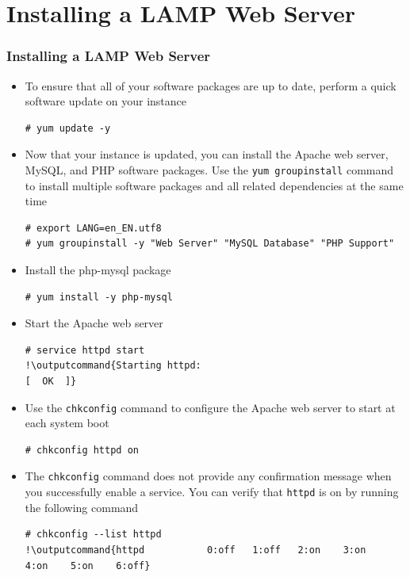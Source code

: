 \documentclass{beamer}
\newcommand{\outputcommand}[1]{\color{darkgreen}{#1}}
\begin{document}
\section{Installing a LAMP Web Server}
\begin{frame}
\frametitle{Installing a LAMP Web Server}
\lstset{language=shell, escapechar=!}
\begin{itemize}
\item To ensure that all of your software packages are up to date, perform a quick software update on your instance
\begin{lstlisting}[escapechar=!]
# yum update -y
\end{lstlisting}
\item Now that your instance is updated, you can install the Apache web server, MySQL, and PHP software packages. Use the \texttt{yum groupinstall} command to install multiple software packages and all related dependencies at the same time
\lstset{language=shell}
\begin{lstlisting}[escapechar=!]
# export LANG=en_EN.utf8
# yum groupinstall -y "Web Server" "MySQL Database" "PHP Support"
\end{lstlisting}
\item Install the php-mysql package
\begin{lstlisting}[escapechar=!]
# yum install -y php-mysql
\end{lstlisting}

\item Start the Apache web server

\lstset{language=shell}
\begin{lstlisting}[escapechar=!]
# service httpd start
!\outputcommand{Starting httpd:                                            [  OK  ]}
\end{lstlisting}

\item Use the \texttt{chkconfig} command to configure the Apache web server to start at each system boot
\lstset{language=shell}
\begin{lstlisting}[escapechar=!]
# chkconfig httpd on
\end{lstlisting}

\item The \texttt{chkconfig} command does not provide any confirmation message when you successfully enable a service. You can verify that \texttt{httpd} is on by running the following command

\lstset{language=shell}
\begin{lstlisting}[escapechar=!]
# chkconfig --list httpd
!\outputcommand{httpd           0:off   1:off   2:on    3:on    4:on    5:on    6:off}
\end{lstlisting}


\end{itemize}
\end{frame}
\end{document}
